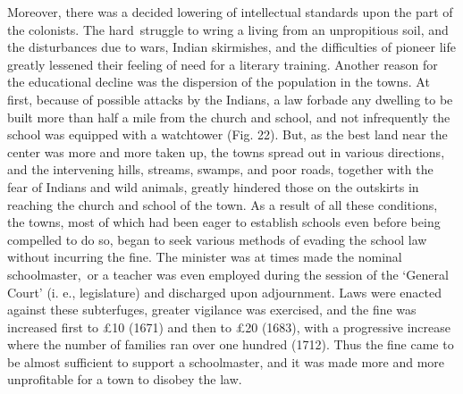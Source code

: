 \documentclass[]{book}
\begin{document}
Moreover, there was a decided lowering of intellectual standards upon the part of the colonists. The hard~struggle to wring a living from an unpropitious soil, and the disturbances due to wars, Indian skirmishes, and the difficulties of pioneer life greatly lessened their feeling of need for a literary training. Another reason for the educational decline was the dispersion of the population in the towns. At first, because of possible attacks by the Indians, a law forbade any dwelling to be built more than half a mile from the church and school, and not infrequently the school was equipped with a watchtower (Fig. 22). But, as the best land near the center was more and more taken up, the towns spread out in various directions, and the intervening hills, streams, swamps, and poor roads, together with the fear of Indians and wild animals, greatly hindered those on the outskirts in reaching the church and school of the town. As a result of all these conditions, the towns, most of which had been eager to establish schools even before being compelled to do so, began to seek various methods of evading the school law without incurring the fine. The minister was at times made the nominal schoolmaster,~or a teacher was even employed during the session of the `General Court' (i. e., legislature) and discharged upon adjournment. Laws were enacted against these subterfuges, greater vigilance was exercised, and the fine was increased first to £10 (1671) and then to £20 (1683), with a progressive increase where the number of families ran over one hundred (1712). Thus the fine came to be almost sufficient to support a schoolmaster, and it was made more and more unprofitable for a town to disobey the law.
\end{document}
